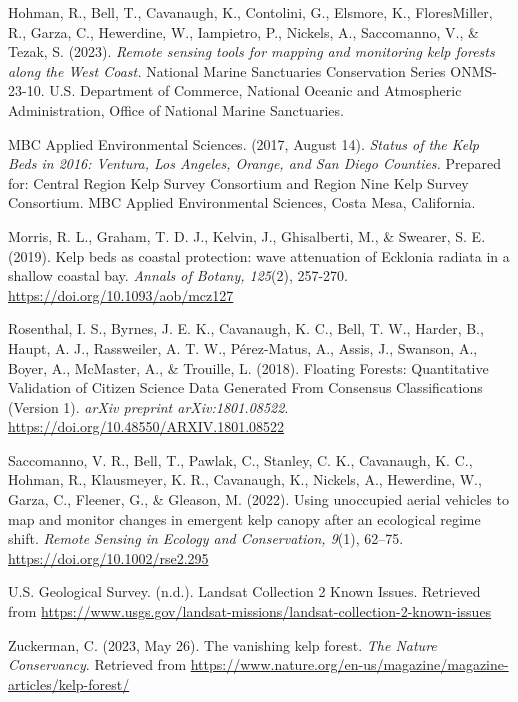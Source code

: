 \documentclass{article}
\begin{document}
\begin{thebibliography}{99}
Hohman, R., Bell, T., Cavanaugh, K., Contolini, G., Elsmore, K., FloresMiller, R., Garza, C., Hewerdine, W., Iampietro, P., Nickels, A., Saccomanno, V., \& Tezak, S. (2023).
\textit{Remote sensing tools for mapping and monitoring kelp forests along the West Coast.}
National Marine Sanctuaries Conservation Series ONMS-23-10. U.S. Department of Commerce, National Oceanic and Atmospheric Administration, Office of National Marine Sanctuaries.

MBC Applied Environmental Sciences. (2017, August 14).
\textit{Status of the Kelp Beds in 2016: Ventura, Los Angeles, Orange, and San Diego Counties.}
Prepared for: Central Region Kelp Survey Consortium and Region Nine Kelp Survey Consortium. MBC Applied Environmental Sciences, Costa Mesa, California.

Morris, R. L., Graham, T. D. J., Kelvin, J., Ghisalberti, M., \& Swearer, S. E. (2019).
Kelp beds as coastal protection: wave attenuation of Ecklonia radiata in a shallow coastal bay.
\textit{Annals of Botany, 125}(2), 257-270. %
\url{https://doi.org/10.1093/aob/mcz127}

Rosenthal, I. S., Byrnes, J. E. K., Cavanaugh, K. C., Bell, T. W., Harder, B., Haupt, A. J., Rassweiler, A. T. W., Pérez-Matus, A., Assis, J., Swanson, A., Boyer, A., McMaster, A., \& Trouille, L. (2018).
Floating Forests: Quantitative Validation of Citizen Science Data Generated From Consensus Classifications (Version 1).
\textit{arXiv preprint arXiv:1801.08522}.
\url{https://doi.org/10.48550/ARXIV.1801.08522}

Saccomanno, V. R., Bell, T., Pawlak, C., Stanley, C. K., Cavanaugh, K. C., Hohman, R., Klausmeyer, K. R., Cavanaugh, K., Nickels, A., Hewerdine, W., Garza, C., Fleener, G., \& Gleason, M. (2022).
Using unoccupied aerial vehicles to map and monitor changes in emergent kelp canopy after an ecological regime shift.
\textit{Remote Sensing in Ecology and Conservation, 9}(1), 62--75.
\url{https://doi.org/10.1002/rse2.295}

U.S. Geological Survey. (n.d.).
Landsat Collection 2 Known Issues.
Retrieved from \url{https://www.usgs.gov/landsat-missions/landsat-collection-2-known-issues}

Zuckerman, C. (2023, May 26).
The vanishing kelp forest.
\textit{The Nature Conservancy}.
Retrieved from \url{https://www.nature.org/en-us/magazine/magazine-articles/kelp-forest/}

\end{thebibliography}
\endgroup %
\end{document}
